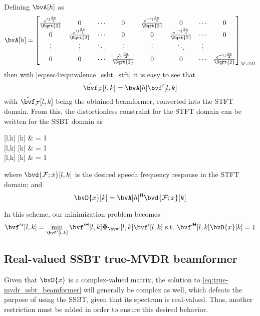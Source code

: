 Defining $\bvAh$ as
\begin{equation}
	\bvAh = \begin{bmatrix}
		\frac{e^{\j\frac{3\pi}{4}}}{\Sqrt{2}} & 0 & \cdots & 0  & \frac{e^{-\j\frac{3\pi}{4}}}{\Sqrt{2}} & 0 & \cdots & 0\\
		0 & \frac{e^{\j\frac{3\pi}{4}}}{\Sqrt{2}} & \cdots & 0  & 0 & \frac{e^{-\j\frac{3\pi}{4}}}{\Sqrt{2}} & \cdots & 0\\
		\vdots & \vdots & \ddots & \vdots & \vdots & \ddots & \vdots  \\
		0 & 0 & \cdots & \frac{e^{\j\frac{3\pi}{4}}}{\Sqrt{2}} & 0 & 0 & \cdots & \frac{e^{-\j\frac{3\pi}{4}}}{\Sqrt{2}}
	\end{bmatrix}\SubSize{M}{2M}
\end{equation}
then with \cref{eq:sec4:equivalence_ssbt_stft} it is easy to see that
\begin{equation}
	\label{eq:sec4:conversion_beamformer_ssbt_to_stft}
	\bvfh_{\F}[l,k] = \bvAh \bvf'[l,k]
\end{equation}
with $\bvfh_{\F}[l,k]$ being the obtained beamformer, converted into the STFT domain. From this, the distortionless constraint for the STFT domain can be written for the SSBT domain as
\begin{equations}
	\he{\bvfh_{\F}}[l,k]  & = 1 \\
	[l,k] \he{\bvAh}  & = 1 \\
	[l,k]  & = 1
\end{equations}
where $\bvd{\F;x}[l,k]$ is the desired speech frequency response in the STFT domain; and
\begin{equation}
	\bvD{x}[k] = \he{\bvAh} \bvd{\F;x}[k]
\end{equation}

In this scheme, our minimization problem becomes
\begin{equation}
	\label{eq:true-mvdr_ssbt_beamformer}
	\bvf'^\star[l,k] = \min_{\bvf'[l,k]} \he{\bvf'}[l,k] \Corr{\bvv'}[l,k] \bvf'[l,k]~\text{s.t.}~\he{\bvf'}[l,k] \bvD{x}[k] = 1
\end{equation}

\subsection{Real-valued SSBT true-MVDR beamformer}
Given that $\bvD{x}$ is a complex-valued matrix, the solution to \cref{eq:true-mvdr_ssbt_beamformer} will generally be complex as well, which defeats the purpose of using the SSBT, given that its spectrum is real-valued. Thus, another restriction must be added in order to ensure this desired behavior.

